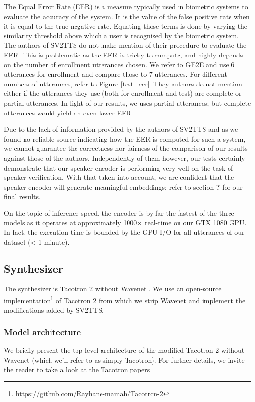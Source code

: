\documentclass[a4paper, oneside, 12pt, english]{article}
\newcommand{\rw}{\color{red}\textbf{?} \color{black}}		%
\begin{document}
The Equal Error Rate (EER) is a measure typically used in biometric systems to evaluate the accuracy of the system. It is the value of the false positive rate when it is equal to the true negative rate. Equating those terms is done by varying the similarity threshold above which a user is recognized by the biometric system. The authors of SV2TTS do not make mention of their procedure to evaluate the EER. This is problematic as the EER is tricky to compute, and highly depends on the number of enrollment utterances chosen. We refer to GE2E and use 6 utterances for enrollment and compare those to 7 utterances. For different numbers of utterances, refer to Figure \ref{test_eer}. They authors do not mention either if the utterances they use (both for enrollment and test) are complete or partial utterances. In light of our results, we uses partial utterances; but complete utterances would yield an even lower EER.

Due to the lack of information provided by the authors of SV2TTS and as we found no reliable source indicating how the EER is computed for such a system, we cannot guarantee the correctness nor fairness of the comparison of our results against those of the authors. Independently of them however, our tests certainly demonstrate that our speaker encoder is performing very well on the task of speaker verification. With that taken into account, we are confident that the speaker encoder will generate meaningful embeddings; refer to section \rw for our final results.

On the topic of inference speed, the encoder is by far the fastest of the three models as it operates at approximately 1000$\times$ real-time on our GTX 1080 GPU. In fact, the execution time is bounded by the GPU I/O for all utterances of our dataset (< 1 minute).

\subsection{Synthesizer} \label{synthesizer}
The synthesizer is Tacotron 2 without Wavenet \citep{WaveNet}. We use an open-source implementation\footnote{\url{https://github.com/Rayhane-mamah/Tacotron-2}} of Tacotron 2 from which we strip Wavenet and implement the modifications added by SV2TTS.

\subsubsection{Model architecture}
We briefly present the top-level architecture of the modified Tacotron 2 without Wavenet (which we'll refer to as simply Tacotron). For further details, we invite the reader to take a look at the Tacotron papers \citep{Tacotron2, Tacotron1}.
\end{document}
